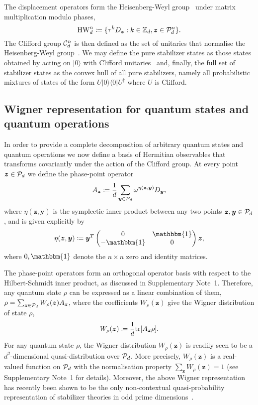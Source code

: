 \documentclass[
onecolumn,
superscriptaddress
]{revtex4-1}
\def\>{\rangle}
\def\<{\langle}
\def\id{\mathbbm{1}}
\renewcommand{\tr}{{\rm{tr}}}
\def\y{\boldsymbol{y}}
\def\z{\boldsymbol{z}}
\renewcommand{\P}{{\cal P}}
\begin{document}
The displacement operators form the Heisenberg-Weyl group~\cite{Folland_1989, Bengtsson_2006} under matrix multiplication modulo phases,
\begin{equation}\label{eq:gp}
    {\rm{HW}}_d^n \coloneqq \{ \tau^k D_{\z}: k \in \mathbb{Z}_d, \z \in \P_d^n\}.
\end{equation}
The Clifford group $ {\cal C}_d^n $ is then defined as the set of unitaries that normalise the Heisenberg-Weyl group~\cite{Appleby_2005}. We may define the pure stabilizer states as those states obtained by acting on $|0\>$ with Clifford unitaries~\cite{Gross2006} and, finally, the full set of stabilizer states as the convex hull of all pure stabilizers, namely all probabilistic mixtures of states of the form $U|0\>\<0|U^\dagger$ where $U$ is Clifford. 

\subsection*{Wigner representation for quantum states and quantum operations}

In order to provide a complete decomposition of arbitrary quantum states and quantum operations we now define a basis of Hermitian observables that transforms covariantly under the action of the Clifford group. At every point $\z \in \P_d$ we define the phase-point operator
\begin{equation}\label{eq:ax}
	A_{\z} \coloneqq \frac{1}{d} \sum_{\y \in \P_d} \omega^{\eta(\z, \y)} D_{\y}, 
\end{equation}
where $\eta(\z, \y)$ is the symplectic inner product between any two points $\z,\y \in \P_d$, and is given explicitly by
\begin{equation}
	\eta(\z, \y) \coloneqq \y^T \begin{pmatrix}
		0  & \id \\
		-\id & 0 \\
	\end{pmatrix} \z,
\end{equation}
where $0, \id$ denote the $n\times n$ zero and identity matrices.

The phase-point operators form an orthogonal operator basis with respect to the Hilbert-Schmidt inner product, as discussed in Supplementary Note~1.
Therefore, any quantum state $\rho$ can be expressed as a linear combination of them, $\rho = \sum_{\z \in \P_d} W_\rho(\z) A_{\z}$, where the coefficients $W_\rho(\z)$ give the Wigner distribution of state $\rho$,
\begin{equation}\label{eq:wstate}
    W_\rho(\z) \coloneqq \frac{1}{d}\tr[A_{\z} \rho].
\end{equation}
For any quantum state $\rho$, the Wigner distribution $W_\rho(\z)$ is readily seen to be a $d^2$-dimensional quasi-distribution over $\P_d$. More precisely, $W_\rho(\z)$ is a real-valued function on $\P_d$ with the normalisation property $\sum_{\z} W_\rho(\z) = 1$ (see Supplementary Note~1 for details). Moreover, the above Wigner representation has recently been shown to be the only non-contextual quasi-probability representation of stabilizer theories in odd prime dimensions~\cite{schmid2021noncontextual}.
\end{document}
